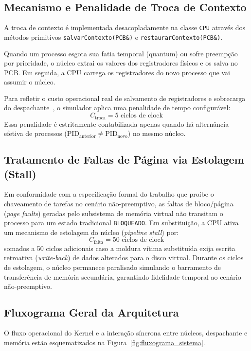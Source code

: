 \documentclass[conference]{IEEEtran}
\begin{document}
\subsection{Mecanismo e Penalidade de Troca de Contexto}
A troca de contexto é implementada desacopladamente na classe \texttt{CPU} através dos métodos primitivos \texttt{salvarContexto(PCB\&)} e \texttt{restaurarContexto(PCB\&)}. 

Quando um processo esgota sua fatia temporal (quantum) ou sofre preempção por prioridade, o núcleo extrai os valores dos registradores físicos e os salva no PCB. Em seguida, a CPU carrega os registradores do novo processo que vai assumir o núcleo.

Para refletir o custo operacional real de salvamento de registradores e sobrecarga do despachante~\cite{silberschatz2018}, o simulador aplica uma penalidade de tempo configurável:
\begin{equation}
C_{\text{troca}} = 5 \text{ ciclos de clock}
\end{equation}
Essa penalidade é estritamente contabilizada apenas quando há alternância efetiva de processos ($\text{PID}_{\text{anterior}} \neq \text{PID}_{\text{novo}}$) no mesmo núcleo.

\subsection{Tratamento de Faltas de Página via Estolagem (Stall)}
Em conformidade com a especificação formal do trabalho que proíbe o chaveamento de tarefas no cenário não-preemptivo, as faltas de bloco/página (\textit{page faults}) geradas pelo subsistema de memória virtual não transitam o processo para um estado tradicional \texttt{BLOQUEADO}. Em substituição, a CPU ativa um mecanismo de estolagem do núcleo (\textit{pipeline stall}) por:
\begin{equation}
C_{\text{falta}} = 50 \text{ ciclos de clock}
\end{equation}
somados a 50 ciclos adicionais caso a moldura vítima substituída exija escrita retroativa (\textit{write-back}) de dados alterados para o disco virtual. Durante os ciclos de estolagem, o núcleo permanece paralisado simulando o barramento de transferência de memória secundária, garantindo fidelidade temporal ao cenário não-preemptivo.

\subsection{Fluxograma Geral da Arquitetura}
O fluxo operacional do Kernel e a interação síncrona entre núcleos, despachante e memória estão esquematizados na Figura~\ref{fig:fluxograma_sistema}.
\end{document}
